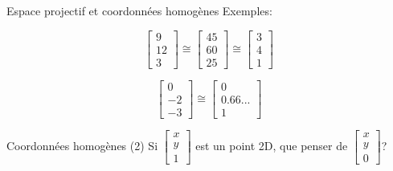\documentclass[compress]{beamer}
\begin{document}
\begin{frame}{Espace projectif et coordonnées homogènes}
    Exemples:

\[
\begin{bmatrix} 9 \\ 12 \\ 3 \end{bmatrix} \cong \begin{bmatrix} 45 \\ 60 \\ 25
\end{bmatrix} \cong \begin{bmatrix} 3 \\ 4 \\ 1 \end{bmatrix}
\]

\[
\begin{bmatrix} 0 \\ -2 \\ -3 \end{bmatrix} \cong \begin{bmatrix} 0 \\ 0.66... \\ 1 \end{bmatrix}
\]


\end{frame}
\begin{frame}{Coordonnées homogènes (2)}
    \centering
    Si $\begin{bmatrix} x \\ y \\ 1 \end{bmatrix}$ est un point 2D, que penser
    de $\begin{bmatrix} x \\ y \\ 0 \end{bmatrix}$?



\end{frame}
\end{document}
